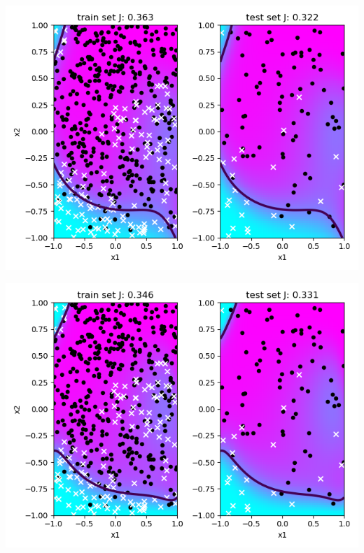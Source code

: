 \documentclass[a4paper]{article}
\begin{document}
\begin{enumerate}
\begin{minipage}[b]{0.4\textwidth}
  \label{gradient_descent_2_2_250}
\end{minipage}
\begin{minipage}[b]{0.4\textwidth}
  \includegraphics[scale=0.35]{plots/gradient_descent_5_2_250.png}
 \captionsetup{justification=centering}
  \label{gradient_descent_5_2_250}
\end{minipage}
\hfill
\begin{minipage}[b]{0.4\textwidth}
  \includegraphics[scale=0.35]{plots/gradient_descent_15_2_250.png}
 \captionsetup{justification=centering}

\end{minipage}
\end{enumerate}
\end{document}
